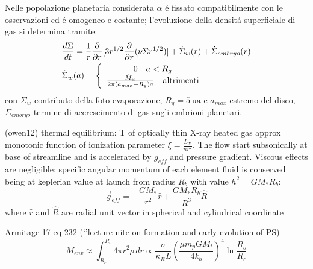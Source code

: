 Nelle popolazione planetaria considerata $\alpha$ \'e fissato compatibilmente con le osservazioni  ed \'e omogeneo e costante; l'evoluzione della densit\'a superficiale di gas si determina tramite:
\begin{align}
	&\frac{d \Sigma}{d t}=\frac{1}{r}\frac{\partial}{\partial r}[3r^{1/2}\frac{\partial}{\partial r}(\nu\Sigma r^{1/2})]+\dot{\Sigma}_w(r)+\dot{\Sigma}_{embryo}(r)\label{eq:diskaccrphev-m18}\\
	&\dot{\Sigma}_w(a)=\left\{\begin{array}{c}0\quad a<R_g\\\frac{\dot{M}_w}{2\pi(a_{max}-R_g)a}\quad \text{altrimenti}\\\end{array}\right.
\end{align}
con $\dot{\Sigma}_w$ contributo della foto-evaporazione, $R_g=\SI{5}{\astronomicalunit}$ e $a_{max}$ estremo del disco,  $\dot{\Sigma}_{embryo}$ termine di accrescimento di gas sugli embrioni planetari.


\begin{workout}
(owen12)
thermal equilibrium: T of optically thin X-ray heated gas approx monotonic function of ionization parameter $\xi=\frac{L_X}{nr^2}$. The flow start subsonically at base of streamline and is accelerated by $g_{eff}$ and pressure gradient. Viscous effects are negligible: specific angular momentum of each element fluid is conserved being at keplerian value at launch from radius $R_b$ with value $h^2=GM_*R_b$:
\[\vec{g}_{eff}=-\frac{GM_*}{r^2}\hat{r}+\frac{GM_*R_b}{R^3}\hat{R}\]
where $\hat{r}$ and $\hat{R}$ are radial unit vector in spherical and cylindrical coordinate
\end{workout}

\begin{workout}
	\cite{mordasini2014grain}
\end{workout}

\begin{workout}
	Armitage 17 eq 232 (`'lecture nite on formation and early evolution of PS)
	\begin{equation}
	M_{env}\approx\int_{R_c}^{R_o}4\pi r^2\rho\,dr\propto\frac{\sigma}{\kappa_RL}(\frac{\mu m_pGM_t}{4k_b})^4\ln{\frac{R_o}{R_c}}
	\end{equation}
\end{workout}

